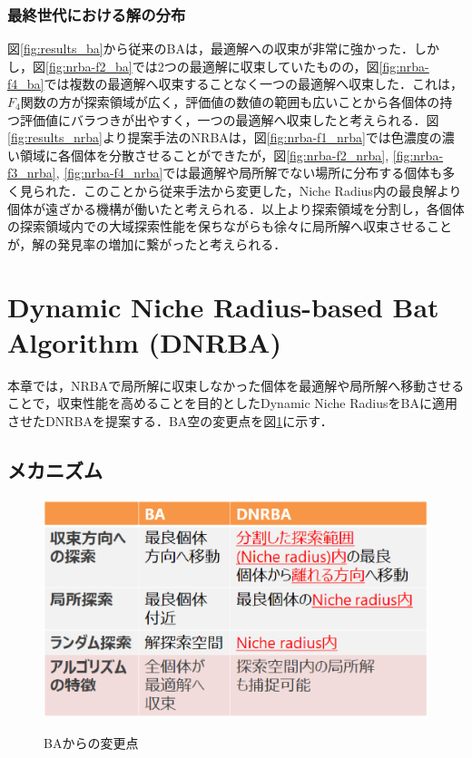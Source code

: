 \documentclass[a4j,11pt]{jarticle}
\begin{document}
\subsubsection{最終世代における解の分布}
\label{sss:dstr_sol} 
図\ref{fig:results_ba}から従来のBAは，最適解への収束が非常に強かった．しかし，図\ref{fig:nrba-f2_ba}では2つの最適解に収束していたものの，図\ref{fig:nrba-f4_ba}では複数の最適解へ収束することなく一つの最適解へ収束した．これは，$F_4$関数の方が探索領域が広く，評価値の数値の範囲も広いことから各個体の持つ評価値にバラつきが出やすく，一つの最適解へ収束したと考えられる．図\ref{fig:results_nrba}より提案手法のNRBAは，図\ref{fig:nrba-f1_nrba}では色濃度の濃い領域に各個体を分散させることができたが，図\ref{fig:nrba-f2_nrba}, \ref{fig:nrba-f3_nrba}, \ref{fig:nrba-f4_nrba}では最適解や局所解でない場所に分布する個体も多く見られた．このことから従来手法から変更した，Niche Radius内の最良解より個体が遠ざかる機構が働いたと考えられる．以上より探索領域を分割し，各個体の探索領域内での大域探索性能を保ちながらも徐々に局所解へ収束させることが，解の発見率の増加に繋がったと考えられる．


\clearpage
\newpage
\section{Dynamic Niche Radius-based Bat Algorithm (DNRBA)}
\label{sec:DNRBA}
本章では，NRBAで局所解に収束しなかった個体を最適解や局所解へ移動させることで，収束性能を高めることを目的としたDynamic Niche RadiusをBAに適用させたDNRBAを提案する．BA空の変更点を図\ref{fig:dnr_tab}に示す．
\subsection{メカニズム}
\label{ss:DNRBA-abst}

\begin{figure}[h]
\centering
\includegraphics[width=0.7\linewidth]{eps/dnrba_table.eps}
\label{fig:dnr_tab}
\caption{BAからの変更点}
\end{figure}
\end{document}
